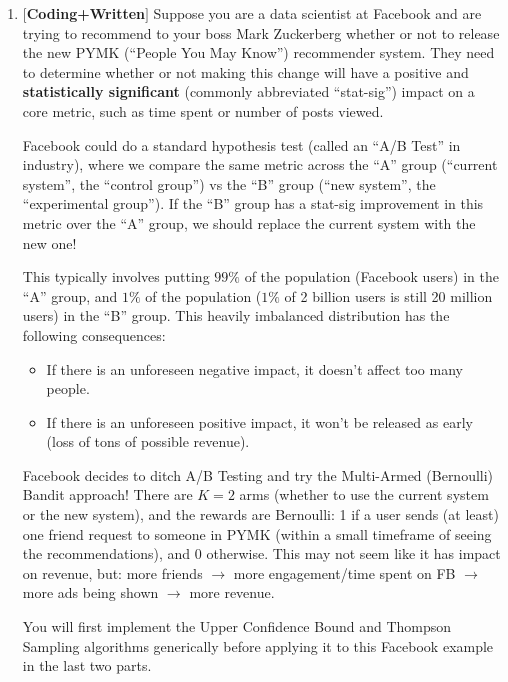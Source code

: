 \documentclass[12pt]{article}
\renewcommand{\|}{\mid}
\begin{document}
\begin{enumerate}
    \pagebreak
    
    
    \item $[$\textbf{Coding+Written}$]$ Suppose you are a data scientist at Facebook and are trying to recommend to your boss Mark Zuckerberg whether or not to release the new PYMK (``People You May Know'') recommender system. They need to determine whether or not making this change will have a positive and \textbf{statistically significant} (commonly abbreviated ``stat-sig'') impact on a core metric, such as time spent or number of posts viewed.
    
    Facebook could do a standard hypothesis test (called an ``A/B Test'' in industry), where we compare the same metric across the ``A'' group (``current system'', the ``control group'') vs the ``B'' group (``new system'', the ``experimental group''). If the ``B'' group has a stat-sig improvement in this metric over the ``A'' group, we should replace the current system with the new one!
    
    This typically involves putting $99\%$ of the population (Facebook users) in the ``A'' group, and $1\%$ of the population ($1\%$ of 2 billion users is still 20 million users) in the ``B'' group. This heavily imbalanced distribution has the following consequences:
    \begin{itemize}
        \item If there is an unforeseen negative impact, it doesn't affect too many people.
        \item If there is an unforeseen positive impact, it won't be released as early (loss of tons of possible revenue).
    \end{itemize}
    Facebook decides to ditch A/B Testing and try the Multi-Armed (Bernoulli) Bandit approach! There are $K=2$ arms (whether to use the current system or the new system), and the rewards are Bernoulli: 1 if a user sends (at least) one friend request to someone in PYMK (within a small timeframe of seeing the recommendations), and 0 otherwise. This may not seem like it has impact on revenue, but: more friends $\to$ more engagement/time spent on FB $\to$ more ads being shown $\to$ more revenue.
    
    You will first implement the Upper Confidence Bound and Thompson Sampling algorithms generically before applying it to this Facebook example in the last two parts.
    

\end{enumerate}
\end{document}
